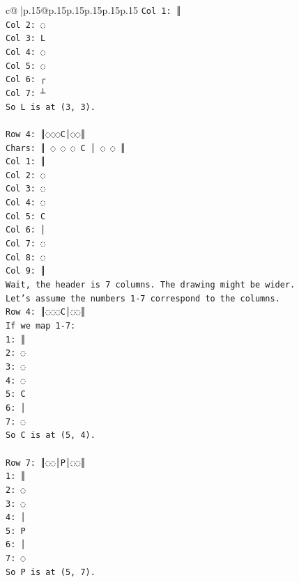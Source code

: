 \documentclass{article}
\begin{document}
{\begin{supertabular}{c@{$\;$}|p{.15\linewidth}@{}p{.15\linewidth}p{.15\linewidth}p{.15\linewidth}p{.15\linewidth}p{.15\linewidth}}
{{{\texttt{Col 1: ║} \\
\texttt{Col 2: ◌} \\
\texttt{Col 3: L} \\
\texttt{Col 4: ◌} \\
\texttt{Col 5: ◌} \\
\texttt{Col 6: ┌} \\
\texttt{Col 7: ┴} \\
\texttt{So L is at (3, 3).} \\
\\ 
\texttt{Row 4: ║◌◌◌C│◌◌║} \\
\texttt{Chars: ║ ◌ ◌ ◌ C │ ◌ ◌ ║} \\
\texttt{Col 1: ║} \\
\texttt{Col 2: ◌} \\
\texttt{Col 3: ◌} \\
\texttt{Col 4: ◌} \\
\texttt{Col 5: C} \\
\texttt{Col 6: │} \\
\texttt{Col 7: ◌} \\
\texttt{Col 8: ◌} \\
\texttt{Col 9: ║} \\
\texttt{Wait, the header is 7 columns. The drawing might be wider.} \\
\texttt{Let's assume the numbers 1{-}7 correspond to the columns.} \\
\texttt{Row 4: ║◌◌◌C│◌◌║} \\
\texttt{If we map 1{-}7:} \\
\texttt{1: ║} \\
\texttt{2: ◌} \\
\texttt{3: ◌} \\
\texttt{4: ◌} \\
\texttt{5: C} \\
\texttt{6: │} \\
\texttt{7: ◌} \\
\texttt{So C is at (5, 4).} \\
\\ 
\texttt{Row 7: ║◌◌│P│◌◌║} \\
\texttt{1: ║} \\
\texttt{2: ◌} \\
\texttt{3: ◌} \\
\texttt{4: │} \\
\texttt{5: P} \\
\texttt{6: │} \\
\texttt{7: ◌} \\
\texttt{So P is at (5, 7).} \\
}}}
\end{supertabular}}
\end{document}
